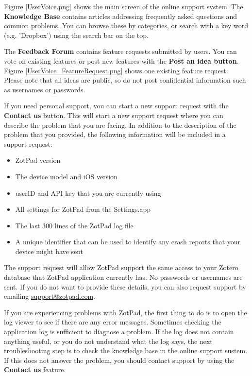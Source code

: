 \documentclass[oneside, openany, 12pt]{tufte-book}
\newcommand{\image}[2]{
	\center
	\fbox{\texttt{[image: images/iPhone/\{\#2]}}}

	\caption{#1 \label{#2}}
	\smallskip\noindent\small Figure \ref{#2}: #1
	}
\newcommand{\image}[2]{
	\caption{#1}
	\label{#2}
	\fbox{\texttt{[image: images/iPad/\{\#2]}}}
	}
\begin{document}
Figure \ref{UserVoice.png} shows the main screen of the online support system. The \textbf{Knowledge Base} contains articles addressing frequently asked questions and common problems. You can browse these by categories, or search with a key word (e.g. 'Dropbox') using the search bar on the top. 

\begin{figure}
\image{Online support}{UserVoice.png}
\end{figure}

The \textbf{Feedback Forum} contains feature requests submitted by users. You can vote on existing features or post new features with the \textbf{Post an idea button}. Figure \ref{UserVoice_FeatureRequest.png} shows one existing feature request. Please note that all ideas are public, so do not post confidential information such as usernames or passwords.

\begin{figure}
\image{Feature requests}{UserVoice_FeatureRequest.png}
\end{figure}

If you need personal support, you can start a new support request with the \textbf{Contact us} button. This will start a new support request where you can describe the problem that you are facing. In addition to the description of the problem that you provided, the following information will be included in a support request:

\begin{itemize}
  \item ZotPad version
  \item The device model and iOS version
  \item userID and API key that you are currently using
  \item All settings for ZotPad from the Settings.app
  \item The last 300 lines of the ZotPad log file
  \item A unique identifier that can be used to identify any crash reports that your device might have sent
\end{itemize}

The support request will allow ZotPad support the same access to your Zotero database that ZotPad application currently has. No passwords or usernames are sent. If you do not want to provide these details, you can also request support by emailing \href{mailto:support@zotpad.com}{support@zotpad.com}.

If you are experiencing problems with ZotPad, the first thing to do is to open the log viewer to see if there are any error messages. Sometimes checking the application log is sufficient to diagnose a problem. If the log does not contain anything useful, or you do not understand what the log says, the next troubleshooting step is to check the knowledge base in the online support sustem. If this does not answer the problem, you should contact support by using the \textbf{Contact us} feature.
\end{document}
